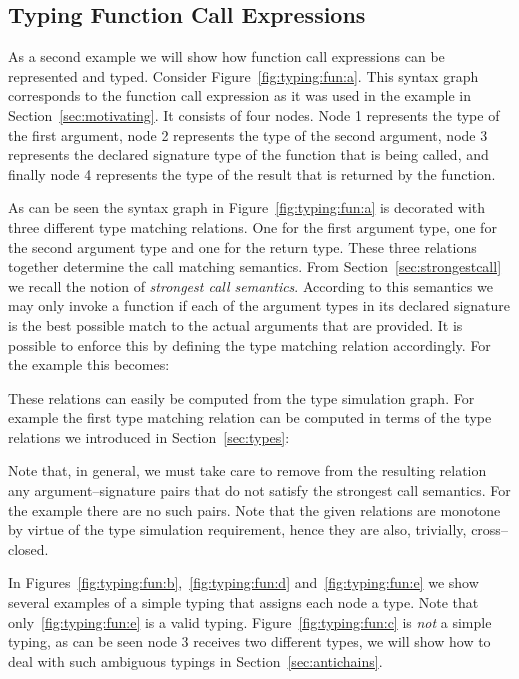 \documentclass{sigplanconf}
\begin{document}
\subsection{Typing Function Call Expressions}

As a second example we will show how function call expressions can be
represented and typed. Consider Figure~\ref{fig:typing:fun:a}. This
syntax graph corresponds to the function call expression
 as it was used in the example in
Section~\ref{sec:motivating}. It consists of four nodes. Node 1
represents the type of the first argument, node 2 represents the type
of the second argument, node 3 represents the declared signature type
of the function that is being called, and finally node 4 represents
the type of the result that is returned by the function.

As can be seen the syntax graph in Figure~\ref{fig:typing:fun:a} is
decorated with three different type matching relations.
One for the first argument type, one for the second argument type and
one for the return type.  These three relations together determine the
call matching semantics. From Section~\ref{sec:strongestcall} we
recall the notion of \emph{strongest call semantics}. According to
this semantics we may only invoke a function if each of the argument
types in its declared signature is the best possible match to the
actual arguments that are provided. It is possible to enforce this by
defining the type matching relation accordingly. For the example this
becomes:

These relations can easily be computed from the type simulation
graph. For example the first type matching relation
 can be computed in terms of the type
relations we introduced in Section~\ref{sec:types}:

Note that, in general, we must take care to remove from the resulting
relation any argument--signature pairs that do not satisfy the
strongest call semantics. For the example there are no such pairs. 
Note that the given relations are monotone by virtue of the type
simulation requirement, hence they are also, trivially, cross--closed.

In Figures~\ref{fig:typing:fun:b},~\ref{fig:typing:fun:d}
and~\ref{fig:typing:fun:e} we show several examples of a simple typing
that assigns each node a type. Note that only~\ref{fig:typing:fun:e} is a
valid typing. Figure~\ref{fig:typing:fun:c} is \emph{not} a simple
typing, as can be seen node 3 receives two different types, we will
show how to deal with such ambiguous typings in
Section~\ref{sec:antichains}.
\end{document}
